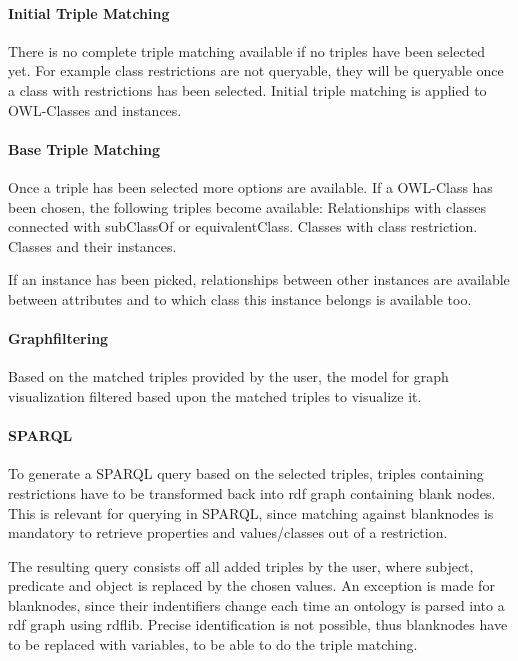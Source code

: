 \paragraph*{Initial Triple Matching}
There is no complete triple matching available if no triples have been selected yet. For example class restrictions are not queryable, they will be queryable once a class
with restrictions has been selected. Initial triple matching is applied to OWL-Classes and instances.

\paragraph*{Base Triple Matching} 
Once a triple has been selected more options are available. 
If a OWL-Class has been chosen, the following triples become available:
Relationships with classes connected with subClassOf or equivalentClass.
Classes with class restriction. 
Classes and their instances. 

If an instance has been picked, relationships between other instances are available
between attributes and to which class this instance belongs is available too.

\paragraph*{Graphfiltering}
Based on the matched triples provided by the user, the model for graph visualization filtered based upon 
the matched triples to visualize it. 

\paragraph*{SPARQL}
To generate a SPARQL query based on the selected triples, triples containing restrictions have to be transformed back into 
rdf graph containing blank nodes. This is relevant for querying in SPARQL, since matching against blanknodes is mandatory to retrieve 
properties and values/classes out of a restriction. 

The resulting query consists off all added triples by the user, where subject, predicate and object is replaced by the 
chosen values. An exception is made for blanknodes, since their indentifiers change each time an ontology is parsed into 
a rdf graph using rdflib. Precise identification is not possible, thus blanknodes have to be replaced with variables, to 
be able to do the triple matching.








